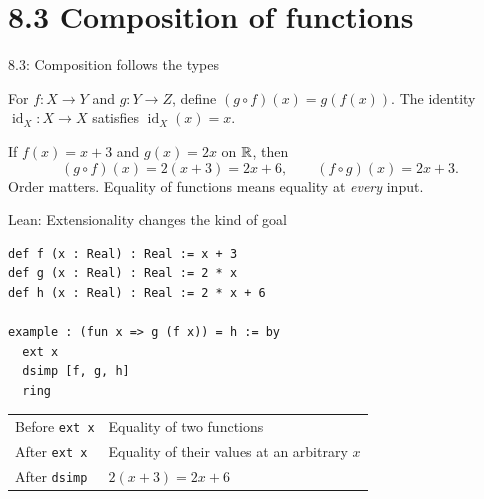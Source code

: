 \section{8.3 Composition of functions}
\begin{frame}{8.3: Composition follows the types}
\begin{center}
\end{center}
For $f:X\to Y$ and $g:Y\to Z$, define $(g\circ f)(x)=g(f(x))$.
The identity $\operatorname{id}_X:X\to X$ satisfies $\operatorname{id}_X(x)=x$.
\medskip

If $f(x)=x+3$ and $g(x)=2x$ on $\mathbb{R}$, then
\[
 (g\circ f)(x)=2(x+3)=2x+6,
 \qquad (f\circ g)(x)=2x+3.
\]
Order matters. Equality of functions means equality at \emph{every} input.
\end{frame}

\begin{frame}[fragile]{Lean: Extensionality changes the kind of goal}
\begin{lstlisting}
def f (x : Real) : Real := x + 3
def g (x : Real) : Real := 2 * x
def h (x : Real) : Real := 2 * x + 6

example : (fun x => g (f x)) = h := by
  ext x
  dsimp [f, g, h]
  ring
\end{lstlisting}
\begin{center}
\begin{tabular}{ll}
\toprule
Before \texttt{ext x} & Equality of two functions\\
After \texttt{ext x} & Equality of their values at an arbitrary $x$\\
After \texttt{dsimp} & $2(x+3)=2x+6$\\
\bottomrule
\end{tabular}
\end{center}
\end{frame}

